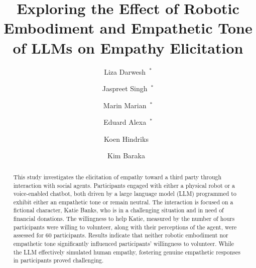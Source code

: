 \documentclass[runningheads]{llncs}
\begin{document}
%
\title{Exploring the Effect of Robotic Embodiment and Empathetic Tone of LLMs on Empathy Elicitation}
%

%
\author{Liza Darwesh~$^*$\and
Jaspreet Singh~$^*$\and
Marin Marian~$^*$ \and
Eduard Alexa~$^*$\and
Koen Hindriks~\and
Kim Baraka~}
%
%
%
\maketitle
\def\thefootnote{*}\def\thefootnote{\arabic{footnote}}
%
\begin{abstract}
This study investigates the elicitation of empathy toward a third party through interaction with social agents. Participants engaged with either a physical robot or a voice-enabled chatbot, both driven by a large language model (LLM) programmed to exhibit either an empathetic tone or remain neutral. The interaction is focused on a fictional character, Katie Banks, who is in a challenging situation and in need of financial donations. The willingness to help Katie, measured by the number of hours participants were willing to volunteer, along with their perceptions of the agent, were assessed for 60 participants. Results indicate that neither robotic embodiment nor empathetic tone significantly influenced participants' willingness to volunteer. While the LLM effectively simulated human empathy, fostering genuine empathetic responses in participants proved challenging.

\end{abstract}
%
%
\end{document}
